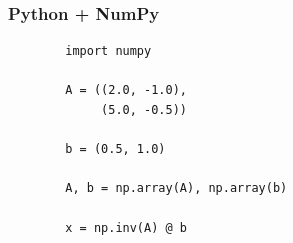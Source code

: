 \documentclass[
    xcolor={svgnames,dvipsnames},
    hyperref={colorlinks, citecolor=DeepPink4, linkcolor=DarkRed, urlcolor=DarkBlue}
    ]{beamer}  %
\newcommand{\1}{\mathbbm 1}
\begin{document}
\begin{frame}
    
    \begin{figure}
       \begin{center} %
       \end{center}
    \end{figure}

    
\end{frame}


\begin{frame}[fragile]
    \frametitle{Python + NumPy}


    \begin{verbatim}
        import numpy 

        A = ((2.0, -1.0),
             (5.0, -0.5))

        b = (0.5, 1.0)

        A, b = np.array(A), np.array(b)

        x = np.inv(A) @ b
    \end{verbatim}

\end{frame}
\end{document}

